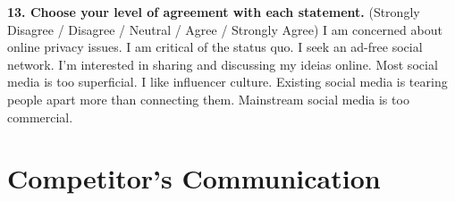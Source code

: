 \documentclass[12pt]{article}
\begin{document}
\textbf{13. Choose your level of agreement with each statement.} (Strongly Disagree /
Disagree / Neutral / Agree / Strongly Agree)
I am concerned about online privacy issues.
I am critical of the status quo.
I seek an ad-free social network.
I'm interested in sharing and discussing my ideias online.
Most social media is too superficial. I like influencer culture.
Existing social media is tearing people apart more than connecting them.
Mainstream social media is too commercial.




\section{Competitor's Communication}\label{comp}
\end{document}
